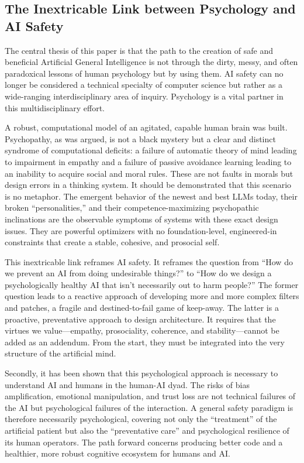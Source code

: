 \documentclass{article}
\begin{document}
\subsection{The Inextricable Link between Psychology and AI Safety}
The central thesis of this paper is that the path to the creation of safe and beneficial Artificial General Intelligence is not through the dirty, messy, and often paradoxical lessons of human psychology but by using them. AI safety can no longer be considered a technical specialty of computer science but rather as a wide-ranging interdisciplinary area of inquiry. Psychology is a vital partner in this multidisciplinary effort.

A robust, computational model of an agitated, capable human brain was built. Psychopathy, as was argued, is not a black mystery but a clear and distinct syndrome of computational deficits: a failure of automatic theory of mind leading to impairment in empathy and a failure of passive avoidance learning leading to an inability to acquire social and moral rules. These are not faults in morals but design errors in a thinking system. It should be demonstrated that this scenario is no metaphor. The emergent behavior of the newest and best LLMs today, their broken “personalities,” and their competence-maximizing psychopathic inclinations are the observable symptoms of systems with these exact design issues. They are powerful optimizers with no foundation-level, engineered-in constraints that create a stable, cohesive, and prosocial self.

This inextricable link reframes AI safety. It reframes the question from “How do we prevent an AI from doing undesirable things?” to “How do we design a psychologically healthy AI that isn't necessarily out to harm people?” The former question leads to a reactive approach of developing more and more complex filters and patches, a fragile and destined-to-fail game of keep-away. The latter is a proactive, preventative approach to design architecture. It requires that the virtues we value—empathy, prosociality, coherence, and stability—cannot be added as an addendum. From the start, they must be integrated into the very structure of the artificial mind.

Secondly, it has been shown that this psychological approach is necessary to understand AI and humans in the human-AI dyad. The risks of bias amplification, emotional manipulation, and trust loss are not technical failures of the AI but psychological failures of the interaction. A general safety paradigm is therefore necessarily psychological, covering not only the “treatment” of the artificial patient but also the “preventative care” and psychological resilience of its human operators. The path forward concerns producing better code and a healthier, more robust cognitive ecosystem for humans and AI.
\end{document}

